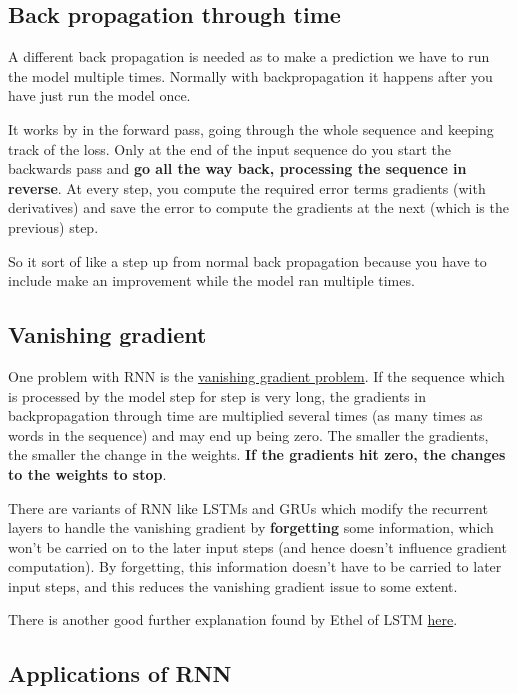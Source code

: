 \documentclass[
  11pt,
  british,
]{article}
\begin{document}
\hypertarget{back-propagation-through-time}{%
\subsection{Back propagation through
time}\label{back-propagation-through-time}}

A different back propagation is needed as to make a prediction we have
to run the model multiple times. Normally with backpropagation it
happens after you have just run the model once.

It works by in the forward pass, going through the whole sequence and
keeping track of the loss. Only at the end of the input sequence do you
start the backwards pass and \textbf{go all the way back, processing the
sequence in reverse}. At every step, you compute the required error
terms gradients (with derivatives) and save the error to compute the
gradients at the next (which is the previous) step.

So it sort of like a step up from normal back propagation because you
have to include make an improvement while the model ran multiple times.

\hypertarget{vanishing-gradient}{%
\subsection{Vanishing gradient}\label{vanishing-gradient}}

One problem with RNN is the
\href{Vanishing\%20gradient\%20problem.md}{vanishing gradient problem}.
If the sequence which is processed by the model step for step is very
long, the gradients in backpropagation through time are multiplied
several times (as many times as words in the sequence) and may end up
being zero. The smaller the gradients, the smaller the change in the
weights. \textbf{If the gradients hit zero, the changes to the weights
to stop}.

There are variants of RNN like LSTMs and GRUs which modify the recurrent
layers to handle the vanishing gradient by \textbf{forgetting} some
information, which won't be carried on to the later input steps (and
hence doesn't influence gradient computation). By forgetting, this
information doesn't have to be carried to later input steps, and this
reduces the vanishing gradient issue to some extent.

There is another good further explanation found by Ethel of LSTM
\href{https://colah.github.io/posts/2015-08-Understanding-LSTMs/}{here}.

\hypertarget{applications-of-rnn}{%
\subsection{Applications of RNN}\label{applications-of-rnn}}
\end{document}
